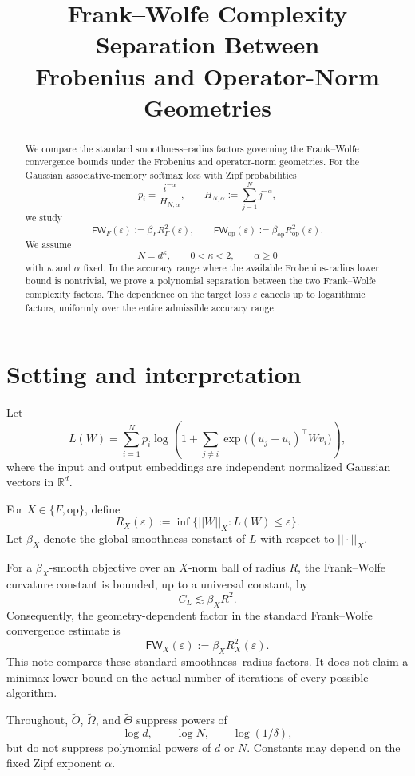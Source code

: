 \documentclass[11pt]{article}
\title{Frank--Wolfe Complexity Separation Between\\
Frobenius and Operator-Norm Geometries}
\author{}
\date{}
\newcommand{\R}{\mathbb{R}}
\newcommand{\op}{\mathrm{op}}
\newcommand{\FW}{\mathsf{FW}}
\newcommand{\eps}{\varepsilon}
\begin{document}
\maketitle

\begin{abstract}
We compare the standard smoothness--radius factors governing the
Frank--Wolfe convergence bounds under the Frobenius and operator-norm
geometries. For the Gaussian associative-memory softmax loss with
Zipf probabilities
\[
p_i=\frac{i^{-\alpha}}{H_{N,\alpha}},
\qquad
H_{N,\alpha}:=\sum_{j=1}^N j^{-\alpha},
\]
we study
\[
\FW_F(\eps):=\beta_F R_F^2(\eps),
\qquad
\FW_{\op}(\eps):=\beta_{\op}R_{\op}^2(\eps).
\]
We assume
\[
N=d^\kappa,
\qquad
0<\kappa<2,
\qquad
\alpha\ge0
\]
with $\kappa$ and $\alpha$ fixed. In the accuracy range where the
available Frobenius-radius lower bound is nontrivial, we prove a
polynomial separation between the two Frank--Wolfe complexity factors.
The dependence on the target loss $\eps$ cancels up to logarithmic
factors, uniformly over the entire admissible accuracy range.
\end{abstract}

\section{Setting and interpretation}

Let
\[
L(W) = \sum_{i=1}^N p_i \log\left( 1+\sum_{j\ne i} \exp\bigl((u_j-u_i)^\top Wv_i\bigr) \right),
\]
where the input and output embeddings are independent normalized
Gaussian vectors in $\R^d$.

For $X\in\{F,\op\}$, define
\[
R_X(\eps) := \inf\bigl\{||W||_X:L(W)\le\eps\bigr\}.
\]
Let $\beta_X$ denote the global smoothness constant of $L$ with
respect to $||\cdot||_X$.

For a $\beta_X$-smooth objective over an $X$-norm ball of radius $R$,
the Frank--Wolfe curvature constant is bounded, up to a universal
constant, by
\[
C_L\lesssim \beta_XR^2.
\]
Consequently, the geometry-dependent factor in the standard
Frank--Wolfe convergence estimate is
\[
\FW_X(\eps):=\beta_XR_X^2(\eps).
\]
This note compares these standard smoothness--radius factors. It does
not claim a minimax lower bound on the actual number of iterations of
every possible algorithm.

Throughout, $\widetilde O$, $\widetilde\Omega$, and
$\widetilde\Theta$ suppress powers of
\[
\log d,\qquad \log N,\qquad \log(1/\delta),
\]
but do not suppress polynomial powers of $d$ or $N$. Constants may
depend on the fixed Zipf exponent $\alpha$.
\end{document}
